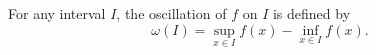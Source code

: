For any interval $I$, the oscillation of $f$ on $I$ is defined by
$$\omega(I) = \sup_{x \in I} f(x) - \inf_{x \in I} f(x).$$
